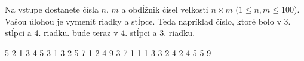 




Na vstupe dostanete čísla $n$, $m$ a obdĺžnik čísel veľkosti $n\times m$ ($1\leq n,m \leq 100$).
Vašou úlohou je vymeniť riadky a stĺpce. Teda napríklad číslo, ktoré bolo v 3. stĺpci a 4. riadku.
bude teraz v 4. stĺpci a 3. riadku.

 5
2 1 3 4 5
3 1 3 2 5
7 1 2 4 9
 3 7 
1 1 1 
3 3 2 
4 2 4 
5 5 9 
\koniec



